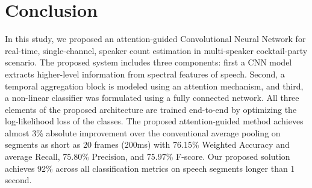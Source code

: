\documentclass[a4paper]{article}
\begin{document}
\section{Conclusion}
\label{sec:con}
In this study, we proposed an attention-guided Convolutional Neural Network for real-time, single-channel, speaker count estimation in multi-speaker cocktail-party scenario. The proposed system includes three components: first a CNN model extracts higher-level information from spectral features of speech. Second, a temporal aggregation block is modeled using an attention mechanism, and third, a non-linear classifier was formulated using a fully connected network. All three elements of the proposed architecture are trained end-to-end by optimizing the log-likelihood loss of the classes. The proposed attention-guided method achieves almost 3\% absolute improvement over the conventional average pooling on segments as short as 20 frames (200ms) with 76.15\% Weighted Accuracy and average Recall, 75.80\% Precision, and 75.97\% F-score. 
Our proposed solution achieves 92\% across all classification metrics on speech segments longer than 1 second.





\end{document}
